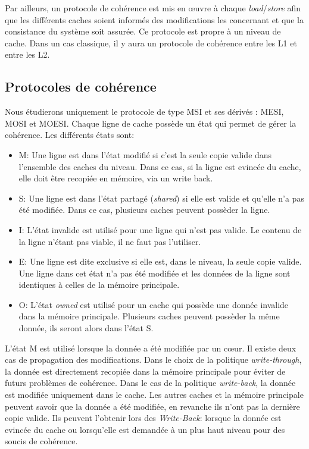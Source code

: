 Par ailleurs, un protocole de cohérence est mis en {\oe}uvre à chaque \textit{load}/\textit{store} afin que les différents caches soient informés des modifications les concernant et que la consistance du système soit assurée. Ce protocole est propre à un niveau de cache. Dans un cas classique, il y aura un protocole de cohérence entre les L1 et entre les L2.

\subsection{Protocoles de cohérence}
\label{coherence}
 Nous étudierons uniquement le protocole de type MSI et ses dérivés : MESI, MOSI et MOESI. Chaque ligne de cache possède un état qui permet de gérer la cohérence. Les différents états sont: \\
\begin{itemize}
\item M: Une ligne est dans l'état modifié si c'est la seule copie valide dans l'ensemble des caches du niveau. Dans ce cas, si la ligne est evincée du cache, elle doit être recopiée en mémoire, via un write back. \\
\item S: Une ligne est dans l'état partagé (\textit{shared}) si elle est valide et qu'elle n'a pas été modifiée. Dans ce cas, plusieurs caches peuvent possèder la ligne. \\
\item I: L'état invalide est utilisé pour une ligne qui n'est pas valide. Le contenu de la ligne n'étant pas viable, il ne faut pas l'utiliser. \\
\item E: Une ligne est dite exclusive si elle est, dans le niveau, la seule copie valide. Une ligne dans cet état n'a pas été modifiée et les données de la ligne sont identiques à celles de la mémoire principale. \\
\item O: L'état \textit{owned} est utilisé pour un cache qui possède une donnée invalide dans la mémoire principale. Plusieurs caches peuvent possèder la même donnée, ils seront alors dans l'état S. \\
\end{itemize}

L'état M est utilisé lorsque la donnée a été modifiée par un c{\oe}ur. Il existe deux cas de propagation des modifications. Dans le choix de la politique \textit{write-through}, la donnée est directement recopiée dans la mémoire principale pour éviter de futurs problèmes de cohérence. Dans le cas de la politique \textit{write-back}, la donnée est modifiée uniquement dans le cache. Les autres caches et la mémoire principale peuvent savoir que la donnée a été modifiée, en revanche ils n'ont pas la dernière copie valide. Ils peuvent l'obtenir lors des \textit{Write-Back}: lorsque la donnée est evincée du cache ou lorsqu'elle est demandée à un plus haut niveau pour des soucis de cohérence.\\

